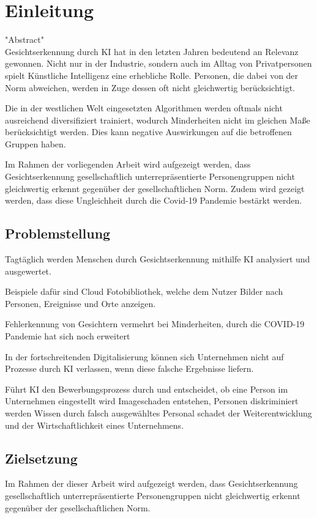 \section{Einleitung}
"Abstract"\\
Gesichtserkennung durch \ac{KI} hat in den letzten Jahren bedeutend an Relevanz gewonnen. Nicht nur in der Industrie, sondern auch im Alltag von Privatpersonen spielt Künstliche Intelligenz eine erhebliche Rolle. Personen, die dabei von der Norm abweichen, werden in Zuge dessen oft nicht gleichwertig berücksichtigt. 

Die in der westlichen Welt eingesetzten Algorithmen werden oftmals nicht ausreichend diversifiziert  trainiert, wodurch Minderheiten nicht im gleichen Maße berücksichtigt werden. Dies kann negative Auswirkungen auf die betroffenen Gruppen haben.

Im Rahmen der vorliegenden Arbeit wird aufgezeigt werden, dass Gesichtserkennung gesellschaftlich unterrepräsentierte Personengruppen nicht gleichwertig erkennt gegenüber der gesellschaftlichen Norm. Zudem wird gezeigt werden, dass diese Ungleichheit durch die Covid-19 Pandemie bestärkt werden.

\subsection{Problemstellung}
Tagtäglich werden Menschen durch Gesichtserkennung mithilfe \ac{KI} analysiert und ausgewertet.

Beispiele dafür sind Cloud Fotobibliothek, welche dem Nutzer Bilder nach Personen, Ereignisse und Orte anzeigen. 

Fehlerkennung von Gesichtern vermehrt bei Minderheiten, 
durch die COVID-19 Pandemie hat sich noch erweitert

In der fortschreitenden Digitalisierung können sich Unternehmen nicht auf Prozesse durch \ac{KI} verlassen, wenn diese falsche Ergebnisse liefern. 

Führt \ac{KI} den Bewerbungsprozess durch und entscheidet, ob eine Person im Unternehmen eingestellt wird
Imageschaden entstehen, Personen diskriminiert werden 
Wissen durch falsch ausgewähltes Personal schadet der Weiterentwicklung und der Wirtschaftlichkeit eines Unternehmens. 

\subsection{Zielsetzung}
Im Rahmen der dieser Arbeit wird aufgezeigt werden, dass Gesichtserkennung gesellschaftlich unterrepräsentierte Personengruppen nicht gleichwertig erkennt gegenüber der gesellschaftlichen Norm. 

